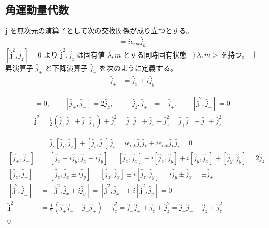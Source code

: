 \documentclass[uplatex,dvipdfmx,a4paper,11pt]{jlreq}
\makeatletter
\numberwithin{equation}{section}
\theoremstyle{definition}
\renewenvironment{proof}[1][\proofname]{\par
  \normalfont
  \topsep6\p@\@plus6\p@ \trivlist
  \item[\hskip\labelsep{\bfseries #1}\@addpunct{\bfseries}]\ignorespaces\quad\par
}{%
  \qed\endtrivlist\@endpefalse
}
\renewcommand\proofname{証明}
\makeatother
\begin{document}
\subsection{角運動量代数}
\begin{definition}[角運動量代数]
  $\hat{\bm{j}}$ を無次元の演算子として次の交換関係が成り立つとする。
  \begin{align}
    [\hat{j}_i, \hat{j}_j] = i\epsilon_{ijk}\hat{j}_k
  \end{align}
  $[\hat{\bm{j}}^2, \hat{j}_z] = 0$ より $\hat{\bm{j}}^2, \hat{j}_z$ は固有値 $\lambda, m$ とする同時固有状態 $\ket|\lambda, m>$ を持つ。
  上昇演算子 $\hat{j}_+$ と下降演算子 $\hat{j}_-$ を次のように定義する。
  \begin{align}
    \hat{j}_\pm & = \hat{j}_x \pm i\hat{j}_y
  \end{align}
\end{definition}

\begin{proposition}
  \begin{align}
    [\hat{\bm{j}}^2, \hat{j}_z] = 0, \qquad [\hat{j}_+, \hat{j}_-] = 2\hat{j}_z, \qquad [\hat{j}_z, \hat{j}_\pm] = \pm \hat{j}_\pm, \qquad [\hat{\bm{j}}^2, \hat{j}_\pm] = 0 \\
    \hat{\bm{j}}^2 = \frac{1}{2}(\hat{j}_+\hat{j}_- + \hat{j}_-\hat{j}_+) + \hat{j}_z^2 = \hat{j}_-\hat{j}_+ + \hat{j}_z + \hat{j}_z^2 = \hat{j}_+\hat{j}_- - \hat{j}_z + \hat{j}_z^2
  \end{align}
\end{proposition}
\begin{proof}
  \begin{align}
    [\hat{\bm{j}}^2, \hat{j}_z]   & = \hat{j}_i[\hat{j}_i, \hat{j}_z] + [\hat{j}_i, \hat{j}_z]\hat{j}_i = i\epsilon_{izk}\hat{j}_i\hat{j}_k + i\epsilon_{izk}\hat{j}_k\hat{j}_i = 0                       \\
    [\hat{j}_+, \hat{j}_-]        & = [\hat{j}_x + i\hat{j}_y, \hat{j}_x - i\hat{j}_y] = [\hat{j}_x, \hat{j}_x] - i[\hat{j}_x, \hat{j}_y] + i[\hat{j}_y, \hat{j}_x] + [\hat{j}_y, \hat{j}_y] = 2\hat{j}_z \\
    [\hat{j}_z, \hat{j}_\pm]      & = [\hat{j}_z, \hat{j}_x \pm i\hat{j}_y] = [\hat{j}_z, \hat{j}_x] \pm i[\hat{j}_z, \hat{j}_y] = i\hat{j}_y \pm \hat{j}_x = \pm \hat{j}_\pm                             \\
    [\hat{\bm{j}}^2, \hat{j}_\pm] & = [\hat{\bm{j}}^2, \hat{j}_x \pm i\hat{j}_y] = [\hat{\bm{j}}^2, \hat{j}_x] \pm i[\hat{\bm{j}}^2, \hat{j}_y] = 0                                                       \\
    \hat{\bm{j}}^2                & = \frac{1}{2}(\hat{j}_+\hat{j}_- + \hat{j}_-\hat{j}_+) + \hat{j}_z^2 = \hat{j}_-\hat{j}_+ + \hat{j}_z + \hat{j}_z^2 = \hat{j}_+\hat{j}_- - \hat{j}_z + \hat{j}_z^2
  \end{align}
\end{proof}
\end{document}
